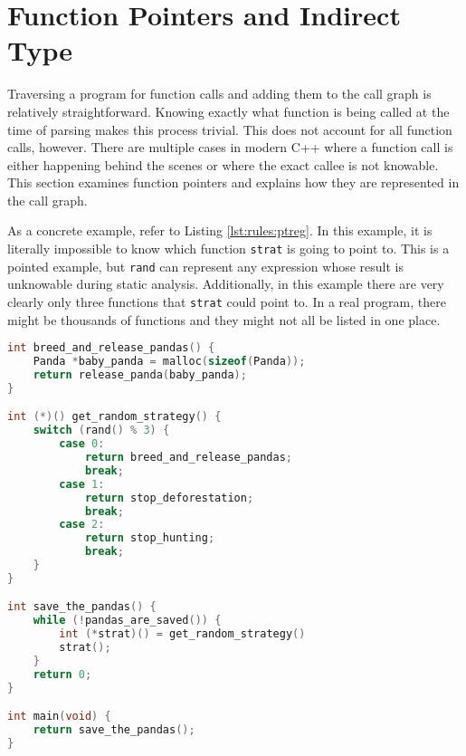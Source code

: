 \section{Function Pointers and Indirect Type}\label{sec:rules:funptrs}

Traversing a program for function calls and adding them to the call graph is relatively straightforward.  Knowing exactly what function is being called at the time of parsing makes this process trivial.  This does not account for all function calls, however.  There are multiple cases in modern C++ where a function call is either happening behind the scenes or where the exact callee is not knowable.  This section examines function pointers and explains how they are represented in the call graph.  

As a concrete example, refer to Listing \ref{lst:rules:ptreg}.  In this example, it is literally impossible to know which function \lstinline{strat} is going to point to.  This is a pointed example, but \lstinline{rand} can represent any expression whose result is unknowable during static analysis.  Additionally, in this example there are very clearly only three functions that \lstinline{strat} could point to.  In a real program, there might be thousands of functions and they might not all be listed in one place.  

\noindent\begin{minipage}[t]{\linewidth}
\begin{lstlisting}[language=C,caption={In this example C program, it is impossible to know statically what the value of \lstinline{strat} is.  Because of this, funqual requires the programmer to annotate function pointers with additional type information. },label={lst:rules:ptreg}]
int breed_and_release_pandas() {
    Panda *baby_panda = malloc(sizeof(Panda));
    return release_panda(baby_panda);
}

int (*)() get_random_strategy() {
    switch (rand() % 3) {
        case 0:
            return breed_and_release_pandas;
            break;
        case 1:
            return stop_deforestation;
            break;
        case 2:
            return stop_hunting;
            break;
    }
}

int save_the_pandas() {
    while (!pandas_are_saved()) {
        int (*strat)() = get_random_strategy()
        strat();
    }
    return 0;
}

int main(void) {
    return save_the_pandas();
}
\end{lstlisting}
\end{minipage}

